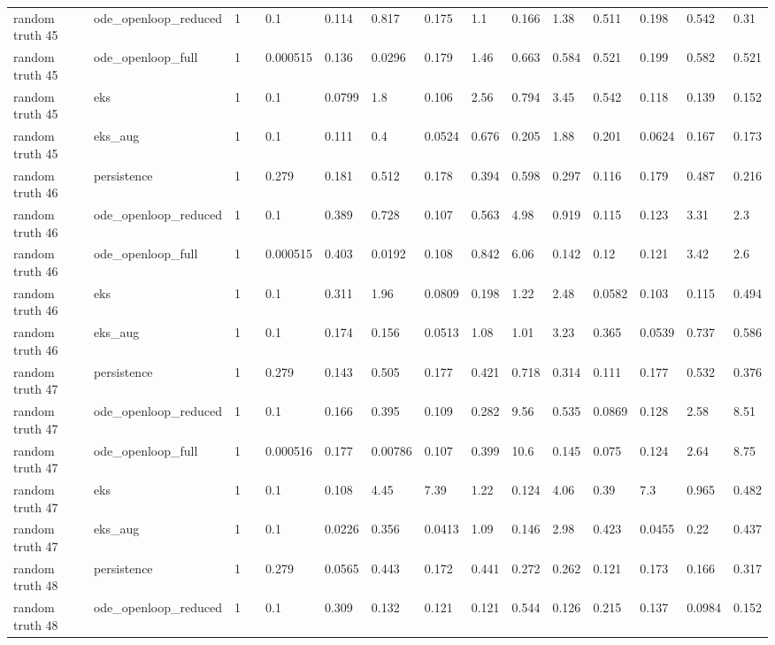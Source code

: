 \begin{table}[t]
\begin{tabular}{lllllllllllllll}
random truth 45 & ode\_openloop\_reduced & 1 &  & 0.1 & 0.114 & 0.817 & 0.175 & 1.1 & 0.166 & 1.38 & 0.511 & 0.198 & 0.542 & 0.31 \\
random truth 45 & ode\_openloop\_full & 1 &  & 0.000515 & 0.136 & 0.0296 & 0.179 & 1.46 & 0.663 & 0.584 & 0.521 & 0.199 & 0.582 & 0.521 \\
random truth 45 & eks & 1 &  & 0.1 & 0.0799 & 1.8 & 0.106 & 2.56 & 0.794 & 3.45 & 0.542 & 0.118 & 0.139 & 0.152 \\
random truth 45 & eks\_aug & 1 &  & 0.1 & 0.111 & 0.4 & 0.0524 & 0.676 & 0.205 & 1.88 & 0.201 & 0.0624 & 0.167 & 0.173 \\
random truth 46 & persistence & 1 &  & 0.279 & 0.181 & 0.512 & 0.178 & 0.394 & 0.598 & 0.297 & 0.116 & 0.179 & 0.487 & 0.216 \\
random truth 46 & ode\_openloop\_reduced & 1 &  & 0.1 & 0.389 & 0.728 & 0.107 & 0.563 & 4.98 & 0.919 & 0.115 & 0.123 & 3.31 & 2.3 \\
random truth 46 & ode\_openloop\_full & 1 &  & 0.000515 & 0.403 & 0.0192 & 0.108 & 0.842 & 6.06 & 0.142 & 0.12 & 0.121 & 3.42 & 2.6 \\
random truth 46 & eks & 1 &  & 0.1 & 0.311 & 1.96 & 0.0809 & 0.198 & 1.22 & 2.48 & 0.0582 & 0.103 & 0.115 & 0.494 \\
random truth 46 & eks\_aug & 1 &  & 0.1 & 0.174 & 0.156 & 0.0513 & 1.08 & 1.01 & 3.23 & 0.365 & 0.0539 & 0.737 & 0.586 \\
random truth 47 & persistence & 1 &  & 0.279 & 0.143 & 0.505 & 0.177 & 0.421 & 0.718 & 0.314 & 0.111 & 0.177 & 0.532 & 0.376 \\
random truth 47 & ode\_openloop\_reduced & 1 &  & 0.1 & 0.166 & 0.395 & 0.109 & 0.282 & 9.56 & 0.535 & 0.0869 & 0.128 & 2.58 & 8.51 \\
random truth 47 & ode\_openloop\_full & 1 &  & 0.000516 & 0.177 & 0.00786 & 0.107 & 0.399 & 10.6 & 0.145 & 0.075 & 0.124 & 2.64 & 8.75 \\
random truth 47 & eks & 1 &  & 0.1 & 0.108 & 4.45 & 7.39 & 1.22 & 0.124 & 4.06 & 0.39 & 7.3 & 0.965 & 0.482 \\
random truth 47 & eks\_aug & 1 &  & 0.1 & 0.0226 & 0.356 & 0.0413 & 1.09 & 0.146 & 2.98 & 0.423 & 0.0455 & 0.22 & 0.437 \\
random truth 48 & persistence & 1 &  & 0.279 & 0.0565 & 0.443 & 0.172 & 0.441 & 0.272 & 0.262 & 0.121 & 0.173 & 0.166 & 0.317 \\
random truth 48 & ode\_openloop\_reduced & 1 &  & 0.1 & 0.309 & 0.132 & 0.121 & 0.121 & 0.544 & 0.126 & 0.215 & 0.137 & 0.0984 & 0.152 \\

\end{tabular}
\end{table}
